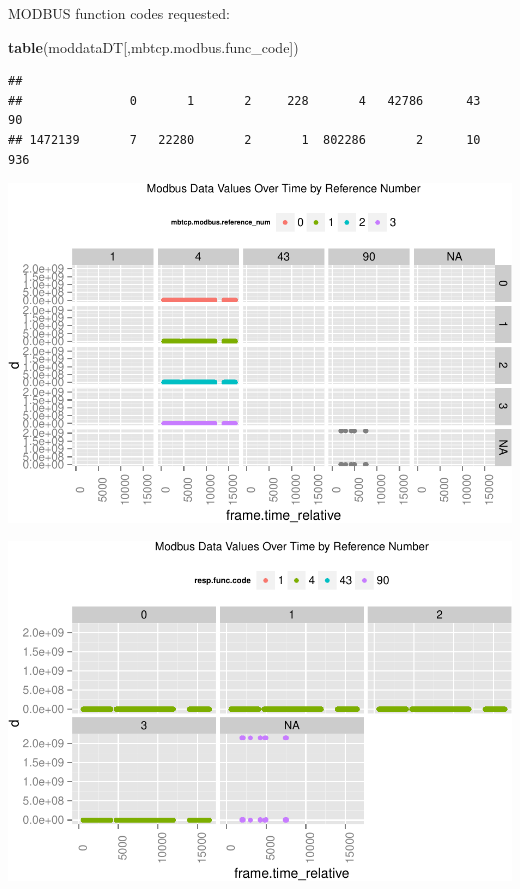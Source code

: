 \documentclass[]{article}
\newenvironment{Shaded}{\begin{snugshade}}{\end{snugshade}}
\newcommand{\KeywordTok}[1]{\textcolor[rgb]{0.13,0.29,0.53}{\textbf{{#1}}}}
\newcommand{\NormalTok}[1]{{#1}}
\begin{document}
MODBUS function codes requested:

\begin{Shaded}
\begin{Highlighting}[]
\KeywordTok{table}\NormalTok{(moddataDT[,mbtcp.modbus.func_code])}
\end{Highlighting}
\end{Shaded}

\begin{verbatim}
## 
##               0       1       2     228       4   42786      43      90 
## 1472139       7   22280       2       1  802286       2      10     936
\end{verbatim}

\includegraphics{edaReport_files/figure-latex/unnamed-chunk-35-1.pdf}

\includegraphics{edaReport_files/figure-latex/unnamed-chunk-36-1.pdf}
\end{document}
